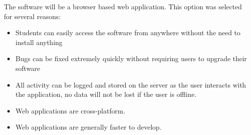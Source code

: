 The software will be a browser based web application. This option was selected
for several reasons:
\begin{itemize}
	\item Students can easily access the software from anywhere without the
		need to install anything
	\item Bugs can be fixed extremely quickly without requiring users to
		upgrade their software
	\item All activity can be logged and stored on the server as the user
		interacts with the application, no data will not be lost if the user 
		is offline.
	\item Web applications are cross-platform.
	\item Web applications are generally faster to develop.
\end{itemize}
